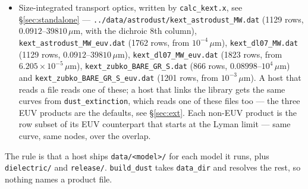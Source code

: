 \documentclass{my_memo}
\newcommand{\code}[1]{\texttt{#1}}
\newcommand{\um}{\ensuremath{\,\mu\mathrm{m}}}
\begin{document}
\begin{itemize}
      T-matrix driver wrote it, \code{../tmatrix/output/q\_astrodust\_jori\_*.dat.gz}
      --- it is a sweep output, opt-in through \code{qpol\_path}, and the only
      one with a birefringence block --- as does the EUV companion
      \code{q\_astrodust\_jori\_euv\_*.dat.gz}, which does \emph{not} ship
      (\S\ref{sec:euv-pol}).
\item Size-integrated transport optics, written by \code{calc\_kext.x}, see
      \S\ref{sec:standalone} --- \code{../data/astrodust/kext\_astrodust\_MW.dat} (1129
      rows, $0.0912$--$39810$\um, with the dichroic 8th column),
      \code{kext\_astrodust\_MW\_euv.dat} (1762 rows, from $10^{-4}$\um),
      \code{kext\_dl07\_MW.dat} (1129 rows, $0.0912$--$39810$\um),
      \code{kext\_dl07\_MW\_euv.dat} (1823 rows, from
      $6.205\times10^{-5}$\um), \code{kext\_zubko\_BARE\_GR\_S.dat} (866 rows,
      $0.08998$--$10^{4}$\um) and \code{kext\_zubko\_BARE\_GR\_S\_euv.dat}
      (1201 rows, from $10^{-3}$\um). A host that reads a file reads one of
      these; a host that links the library gets the same curves from
      \code{dust\_extinction}, which reads one of these files too --- the three
      EUV products are the defaults, see \S\ref{sec:ext}.
      Each non-EUV product is the row subset of its EUV counterpart that starts
      at the Lyman limit --- same curve, same nodes, over the overlap.
\end{itemize}

\noindent The rule is that a host ships \code{data/<model>/} for each model it
runs, plus \code{dielectric/} and \code{release/}. \code{build\_dust} takes
\code{data\_dir} and resolves the rest, so nothing names a product file.
\end{document}
